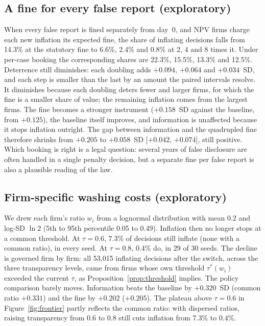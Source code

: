 \documentclass[11pt]{article}
\begin{document}
\subsection{A fine for every false report (exploratory)}\label{app:perreport}

When every false report is fined separately from day~0, and NPV firms charge each new inflation its expected fine, the share of inflating decisions falls from 14.3\% at the statutory fine to 6.6\%, 2.4\% and 0.8\% at 2, 4 and 8 times it. Under per-case booking the corresponding shares are 22.3\%, 15.5\%, 13.3\% and 12.5\%. Deterrence still diminishes: each doubling adds $+0.094$, $+0.064$ and $+0.034$~SD, and each step is smaller than the last by an amount the paired intervals resolve. It diminishes because each doubling deters fewer and larger firms, for which the fine is a smaller share of value; the remaining inflation comes from the largest firms. The fine becomes a stronger instrument ($+0.158$~SD against the baseline, from $+0.125$), the baseline itself improves, and information is unaffected because it stops inflation outright. The gap between information and the quadrupled fine therefore shrinks from $+0.205$ to $+0.058$~SD [$+0.042$, $+0.074$], still positive. Which booking is right is a legal question: several years of false disclosure are often handled in a single penalty decision, but a separate fine per false report is also a plausible reading of the law.

\subsection{Firm-specific washing costs (exploratory)}\label{app:hetero}

We drew each firm's ratio $w_i$ from a lognormal distribution with mean 0.2 and log-SD $\ln 2$ (5th to 95th percentile 0.05 to 0.49). Inflation then no longer stops at a common threshold. At $\tau = 0.6$, 7.3\% of decisions still inflate (none with a common ratio), in every seed. At $\tau = 0.8$, 0.4\% do, in 29 of 30 seeds. The decline is governed firm by firm: all 53,015 inflating decisions after the switch, across the three transparency levels, came from firms whose own threshold $\tau^*(w_i)$ exceeded the current $\tau$, as Proposition~\ref{prop:threshold} implies. The policy comparison barely moves. Information beats the baseline by $+0.320$~SD (common ratio $+0.331$) and the fine by $+0.202$ ($+0.205$). The plateau above $\tau = 0.6$ in Figure~\ref{fig:frontier} partly reflects the common ratio: with dispersed ratios, raising transparency from 0.6 to 0.8 still cuts inflation from 7.3\% to 0.4\%.
\end{document}
